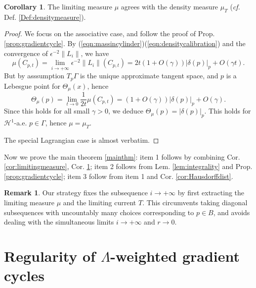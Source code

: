 \documentclass{article}
\theoremstyle{definition}
\newtheorem{cor}[thm]{Corollary}
\newtheorem{rmk}{Remark}
\newcommand{\cf}{\emph{cf.} }
\newcommand{\norm}[1]{\left\lVert#1\right\rVert}
\begin{document}
		
		




\begin{cor}\label{cor:densitymeasure}
The limiting measure $\mu$ agrees with the density measure $\mu_T$ (\cf Def. \ref{Def:densitymeasure}).
\end{cor}




\begin{proof}
We focus on the associative case, and follow the proof of Prop. \ref{prop:gradientcycle}.
By (\ref{eqn:massincylinder})(\ref{eqn:densitycalibration}) and the convergence of $\epsilon^{-2} \norm{L_i}$, we have
\[
\mu(  C_{p,t}  ) = \lim_{i\to +\infty} \epsilon^{-2} \norm{L_i} (C_{p,t}) =     2t (1+ O(\gamma ) ) |\delta(p)|_p + O(\gamma  t )         .
\]
But by asssumption $T_p \Gamma$ is the unique approximate tangent space, and $p$ is a Lebesgue point for $\Theta_\mu(x)$, hence
\[
\Theta_\mu(p)= \lim_{t\to 0} \frac{1}{2t}  \mu(  C_{p,t}  ) =   (1+ O(\gamma ) )|\delta(p)|_p + O(\gamma  ) .
\]
Since this holds for all small $\gamma>0$, we deduce $\Theta_\mu(p)=|\delta(p)|_p$. This holds for $\mathcal{H}^1$-a.e. $p\in \Gamma$, hence $\mu=\mu_T$.

The special Lagrangian case is almost verbatim.
\end{proof}



		
		
		
		
	Now we prove the main theorem \ref{mainthm}: item 1 follows by combining Cor. \ref{cor:limitingmeasure},  Cor. \ref{cor:densitymeasure}; item 2 follows from Lem. \ref{lem:integrality} and Prop. \ref{prop:gradientcycle}; item 3 follow from item 1 and Cor. \ref{cor:Hausdorffdist}.
		
		
		\begin{rmk}
		Our strategy fixes the subsequence $i\to +\infty$ by first extracting the limiting measure $\mu$ and the limiting current $T$. This circumvents taking diagonal subsequences with uncountably many choices corresponding to $p\in B$, and avoids dealing with the simultaneous limits $i\to +\infty$ and $r\to 0$. 
		\end{rmk}
		
		
	
	
	
	

	
	
	
	
	
		\section{Regularity of $\Lambda$-weighted gradient cycles}\label{sect:regularity}
		
\end{document}
